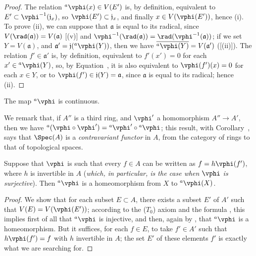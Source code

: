 \begin{proof}
The relation ${}^a\vphi(x)\in V(E')$ is, by definition, equivalent to $E'\subset\vphi^{-1}(\mathfrak{j}_x)$, so $\vphi(E')\subset\mathfrak{j}_x$, and finally $x\in V(\vphi(E'))$, hence (i).
To prove (ii), we can suppose that $\mathfrak{a}$ is equal to its radical, since $V(\rad(\mathfrak{a}))=V(\mathfrak{a})$ [(v)] and $\vphi^{-1}(\rad(\mathfrak{a}))=\rad(\vphi^{-1}(\mathfrak{a}))$;
if we set $Y=V(\mathfrak{a})$, and $\mathfrak{a}'=\mathfrak{j}({}^a\vphi(Y))$, then we have $\overline{{}^a\vphi(Y)}=V(\mathfrak{a}')$ ([(ii)]).
The relation $f'\in\mathfrak{a}'$ is, by definition, equivalent to $f'(x')=0$ for each $x'\in{}^a\vphi(Y)$, so, by Equation~, it is also equivalent to $\vphi(f')(x)=0$ for each $x\in Y$, or to $\vphi(f')\in\mathfrak{j}(Y)=\mathfrak{a}$, since $\mathfrak{a}$ is equal to its radical;
hence (ii).
\end{proof}

\begin{corollary}[1.2.3]
\label{I.1.2.3}
The map ${}^a\vphi$ is continuous.
\end{corollary}

We remark that, if $A''$ is a third ring, and $\vphi'$ a homomorphism $A''\to A'$, then we have ${}^a(\vphi\circ\vphi')={}^a\vphi'\circ{}^a\vphi$;
this result, with Corollary~, says that $\Spec(A)$ is a \emph{contravariant functor} in $A$, from the category of rings to that of topological spaces.

\begin{corollary}[1.2.4]
\label{I.1.2.4}
Suppose that $\vphi$ is such that every $f\in A$ can be written as $f=h\vphi(f')$, where $h$ is invertible in $A$ (\emph{which, in particular, is the case when $\vphi$ is \emph{surjective}}).
Then ${}^a\vphi$ is a homeomorphism from $X$ to ${}^a\vphi(X)$.
\end{corollary}

\begin{proof}
We show that for each subset $E\subset A$, there exists a subset $E'$ of $A'$ such that $V(E)=V(\vphi(E'))$;
according to the ($T_0$) axiom  and the formula , this implies first of all that ${}^a\vphi$ is injective, and then, again by , that ${}^a\vphi$ is a homeomorphism.
But it suffices, for each $f\in E$, to take $f'\in A'$ such that $h\vphi(f')=f$ with $h$ invertible in $A$;
the set $E'$ of these elements $f'$ is exactly what we are searching for.
\end{proof}

